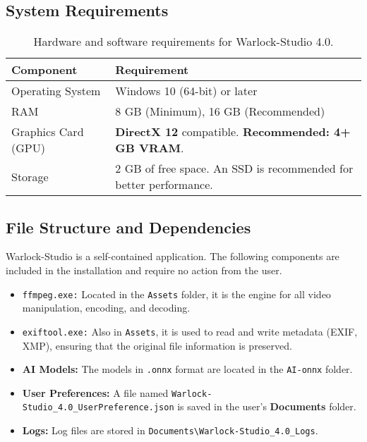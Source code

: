 \documentclass[11pt, a4paper]{article}
\newcommand{\inlinecode}[1]{\colorbox{WarlockLightGray}{\small\texttt{#1}}}
\begin{document}
\subsection{System Requirements}
\begin{table}[H]
    \centering %
    \begin{tabular}{ll}
        \toprule %
        \textbf{Component} & \textbf{Requirement} \\
        \midrule %
        Operating System & Windows 10 (64-bit) or later \\
        RAM & 8 GB (Minimum), 16 GB (Recommended) \\
        Graphics Card (GPU) & \textbf{DirectX 12} compatible. \textbf{Recommended: 4+ GB VRAM}. \\
        Storage & 2 GB of free space. An SSD is recommended for better performance. \\
        \bottomrule %
    \end{tabular}
    \caption{Hardware and software requirements for Warlock-Studio 4.0.}
\end{table}

\subsection{File Structure and Dependencies}
\begin{infobox}
Warlock-Studio is a self-contained application. The following components are included in the installation and require no action from the user.
\end{infobox}
\begin{itemize}[leftmargin=*]
    \item \inlinecode{ffmpeg.exe:} Located in the \texttt{Assets} folder, it is the engine for all video manipulation, encoding, and decoding.
    \item \inlinecode{exiftool.exe:} Also in \texttt{Assets}, it is used to read and write metadata (EXIF, XMP), ensuring that the original file information is preserved.
    \item \textbf{AI Models:} The models in \texttt{.onnx} format are located in the \texttt{AI-onnx} folder.
    \item \textbf{User Preferences:} A file named \texttt{Warlock-Studio\_4.0\_UserPreference.json} is saved in the user's \textbf{Documents} folder.
    \item \textbf{Logs:} Log files are stored in \texttt{Documents\textbackslash Warlock-Studio\_4.0\_Logs}.
\end{itemize}
\end{document}
